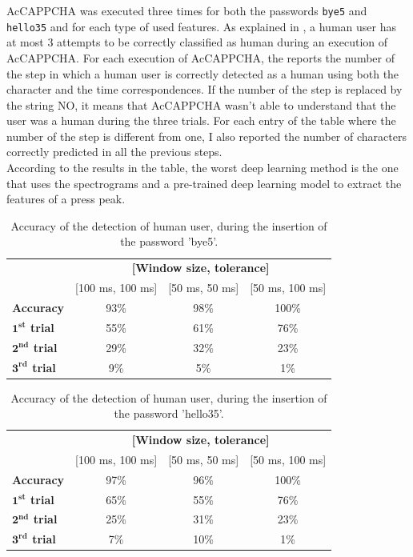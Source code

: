 AcCAPPCHA was executed three times for both the passwords \texttt{bye5} and \texttt{hello35} and for each type of used features. As explained in , a human user has at most 3 attempts to be correctly classified as human during an execution of AcCAPPCHA. For each execution of AcCAPPCHA, the  reports the number of the step in which a human user is correctly detected as a human using both the character and the time correspondences. If the number of the step is replaced by the string NO, it means that AcCAPPCHA wasn't able to understand that the user was a human during the three trials. For each entry of the table where the number of the step is different from one, I also reported the number of characters correctly predicted in all the previous steps.\\
According to the results in the table, the worst deep learning method is the one that uses the spectrograms and a pre-trained deep learning model to extract the features of a press peak.
\begin{table}[H]
\centering\footnotesize
\begin{tabular}{lccc}
\cline{2-4}
&\multicolumn{3}{c}{\textbf{[Window size, tolerance]}}\\
\cline{2-4}
&{[100 ms, 100 ms]}&{[50 ms, 50 ms]}&{[50 ms, 100 ms]}\\
\hline
{\textbf{Accuracy}}&{93\%}&{98\%}&{100\%}\\
\hline
{\textbf{$\mathbf{1^{st}}$ trial}}&{55\%}&{61\%}&{76\%}\\
\hline
{\textbf{$\mathbf{2^{nd}}$ trial}}&{29\%}&{32\%}&{23\%}\\
\hline
{\textbf{$\mathbf{3^{rd}}$ trial}}&{9\%}&{5\%}&{1\%}\\
\hline
\end{tabular}
\caption{\footnotesize{Accuracy of the detection of human user, during the insertion of the password 'bye5'.}}
\label{Results:bye5}
\end{table}
\begin{table}[H]
\centering\footnotesize
\begin{tabular}{lccc}
\cline{2-4}
&\multicolumn{3}{c}{\textbf{[Window size, tolerance]}}\\
\cline{2-4}
&{[100 ms, 100 ms]}&{[50 ms, 50 ms]}&{[50 ms, 100 ms]}\\
\hline
{\textbf{Accuracy}}&{97\%}&{96\%}&{100\%}\\
\hline
{\textbf{$\mathbf{1^{st}}$ trial}}&{65\%}&{55\%}&{76\%}\\
\hline
{\textbf{$\mathbf{2^{nd}}$ trial}}&{25\%}&{31\%}&{23\%}\\
\hline
{\textbf{$\mathbf{3^{rd}}$ trial}}&{7\%}&{10\%}&{1\%}\\
\hline
\end{tabular}
\caption{\footnotesize{Accuracy of the detection of human user, during the insertion of the password 'hello35'.}}
\label{Results:hello35}
\end{table}
